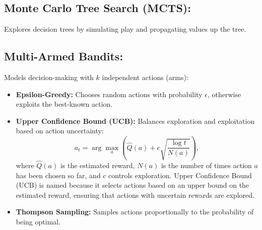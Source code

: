 \documentclass[12pt,a4paper]{article}
\begin{document}
\subsection{Monte Carlo Tree Search (MCTS):} Explores decision trees by simulating play and propagating values up the tree.

\subsection{Multi-Armed Bandits:} Models decision-making with $k$ independent actions (arms):
    \begin{itemize}
        \item \textbf{Epsilon-Greedy:} Chooses random actions with probability $\epsilon$, otherwise exploits the best-known action.
        \item \textbf{Upper Confidence Bound (UCB):} Balances exploration and exploitation based on action uncertainty:
        \[ a_t = \arg\max_a \left( \hat{Q}(a) + c \sqrt{\frac{\log t}{N(a)}} \right), \]
        where $\hat{Q}(a)$ is the estimated reward, $N(a)$ is the number of times action $a$ has been chosen so far, and $c$ controls exploration. Upper Confidence Bound (UCB) is named because it selects actions based on an upper bound on the estimated reward, ensuring that actions with uncertain rewards are explored.
        \item \textbf{Thompson Sampling:} Samples actions proportionally to the probability of being optimal.
    \end{itemize}
\end{document}
